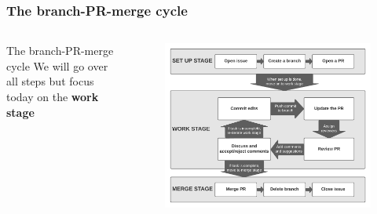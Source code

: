 \documentclass[aspectratio=169]{beamer} %
\begin{document}
\begin{frame}
\frametitle{The branch-PR-merge cycle}

	\begin{columns}[c]
	
		\Large The branch-PR-merge cycle
		\vspace{1cm}
		\Large We will go over all steps but focus today on the \textbf{work stage}	

		
		\vspace{-.75cm}
		\begin{figure}
			\centering
			\includegraphics[width=\textwidth]{./img/branch-pr-merge-cycle.png}
		\end{figure}
		
	\end{columns}
\end{frame}
\end{document}
